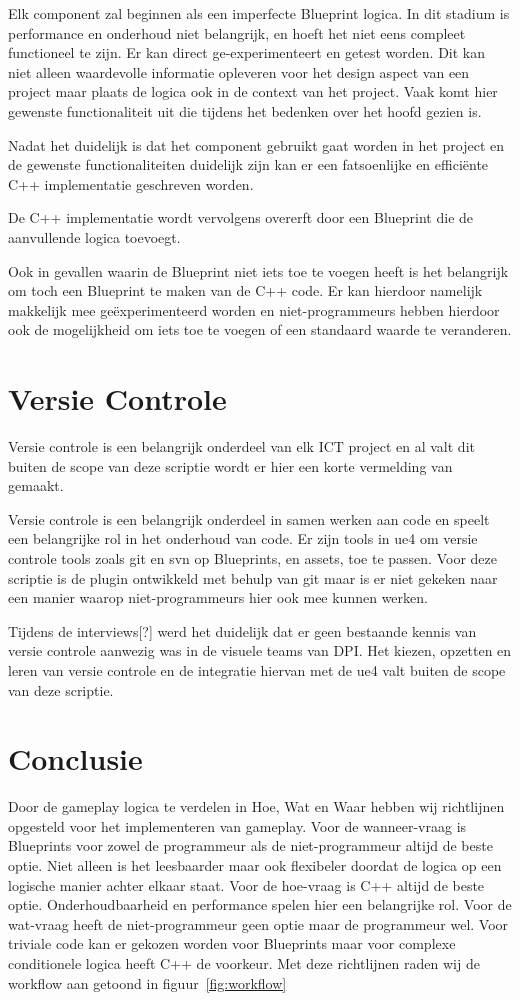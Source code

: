 Elk component zal beginnen als een imperfecte Blueprint logica. In dit stadium is performance en onderhoud niet belangrijk, en hoeft het niet eens compleet functioneel te zijn. Er kan direct ge-experimenteert en getest worden. Dit kan niet alleen waardevolle informatie opleveren voor het design aspect van een project maar plaats de logica ook in de context van het project. Vaak komt hier gewenste functionaliteit uit die tijdens het bedenken over het hoofd gezien is.

Nadat het duidelijk is dat het component gebruikt gaat worden in het project en de gewenste functionaliteiten duidelijk zijn kan er een fatsoenlijke en efficiënte C++ implementatie geschreven worden.

De C++ implementatie wordt vervolgens overerft door een Blueprint die de aanvullende logica toevoegt.

Ook in gevallen waarin de Blueprint niet iets toe te voegen heeft is het belangrijk om toch een Blueprint te maken van de C++ code. Er kan hierdoor namelijk makkelijk mee geëxperimenteerd worden en niet-programmeurs hebben hierdoor ook de mogelijkheid om iets toe te voegen of een standaard waarde te veranderen.

\section{Versie Controle}
Versie controle is een belangrijk onderdeel van elk ICT project en al valt dit buiten de scope van deze scriptie wordt er hier een korte vermelding van gemaakt.

Versie controle is een belangrijk onderdeel in samen werken aan code en speelt een belangrijke rol in het onderhoud van code. Er zijn tools in \gls{ue4} om versie controle tools zoals git en svn op Blueprints, en assets, toe te passen. Voor deze scriptie is de plugin ontwikkeld met behulp van git maar is er niet gekeken naar een manier waarop niet-programmeurs hier ook mee kunnen werken.

Tijdens de interviews[?] werd het duidelijk dat er geen bestaande kennis van versie controle aanwezig was in de visuele teams van DPI. Het kiezen, opzetten en leren van versie controle en de integratie hiervan met de \gls{ue4} valt buiten de scope van deze scriptie.

\section{Conclusie}
Door de gameplay logica te verdelen in Hoe, Wat en Waar hebben wij richtlijnen opgesteld voor het implementeren van gameplay. Voor de wanneer-vraag is Blueprints voor zowel de programmeur als de niet-programmeur altijd de beste optie. Niet alleen is het leesbaarder maar ook flexibeler doordat de logica op een logische manier achter elkaar staat. Voor de hoe-vraag is C++ altijd de beste optie. Onderhoudbaarheid en performance spelen hier een belangrijke rol. Voor de wat-vraag heeft de niet-programmeur geen optie maar de programmeur wel. Voor triviale code kan er gekozen worden voor Blueprints maar voor complexe conditionele logica heeft C++ de voorkeur. Met deze richtlijnen raden wij de workflow aan getoond in figuur~\ref{fig:workflow}